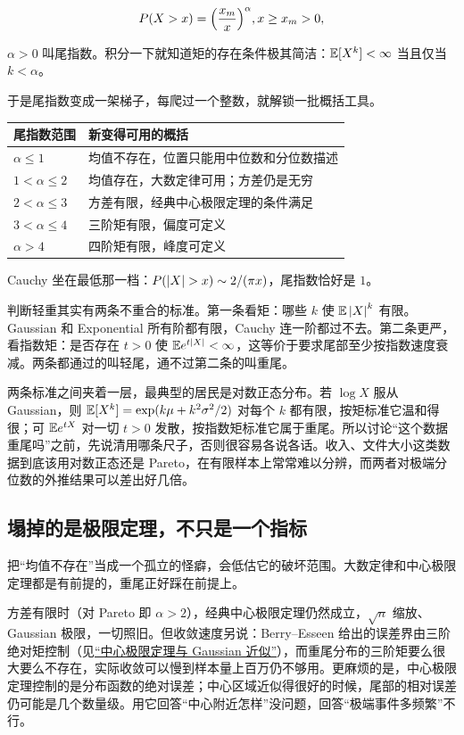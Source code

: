 \[
P(X>x)=\Bigl(\frac{x_m}{x}\Bigr)^{\alpha},\qquad x\ge x_m>0,
\]

\(\alpha>0\) 叫尾指数。积分一下就知道矩的存在条件极其简洁：\(\E[X^k]<\infty\) 当且仅当 \(k<\alpha\)。

于是尾指数变成一架梯子，每爬过一个整数，就解锁一批概括工具。

{\def\LTcaptype{none}
\begin{longtable}{@{}ll@{}}
\toprule\noalign{}
尾指数范围 & 新变得可用的概括 \\
\midrule\noalign{}
\endhead
\bottomrule\noalign{}
\endlastfoot
\(\alpha\le1\) & 均值不存在，位置只能用中位数和分位数描述 \\
\(1<\alpha\le2\) & 均值存在，大数定律可用；方差仍是无穷 \\
\(2<\alpha\le3\) & 方差有限，经典中心极限定理的条件满足 \\
\(3<\alpha\le4\) & 三阶矩有限，偏度可定义 \\
\(\alpha>4\) & 四阶矩有限，峰度可定义 \\
\end{longtable}
}

Cauchy 坐在最低那一档：\(P(\abs X>x)\sim 2/(\pi x)\)，尾指数恰好是 \(1\)。

判断轻重其实有两条不重合的标准。第一条看矩：哪些 \(k\) 使 \(\E\abs X^k\) 有限。Gaussian 和 Exponential 所有阶都有限，Cauchy 连一阶都过不去。第二条更严，看指数矩：是否存在 \(t>0\) 使 \(\E e^{t\abs X}<\infty\)，这等价于要求尾部至少按指数速度衰减。两条都通过的叫轻尾，通不过第二条的叫重尾。

两条标准之间夹着一层，最典型的居民是对数正态分布。若 \(\log X\) 服从 Gaussian，则 \(\E[X^k]=\exp(k\mu+k^2\sigma^2/2)\) 对每个 \(k\) 都有限，按矩标准它温和得很；可 \(\E e^{tX}\) 对一切 \(t>0\) 发散，按指数矩标准它属于重尾。所以讨论``这个数据重尾吗''之前，先说清用哪条尺子，否则很容易各说各话。收入、文件大小这类数据到底该用对数正态还是 Pareto，在有限样本上常常难以分辨，而两者对极端分位数的外推结果可以差出好几倍。

\subsection{塌掉的是极限定理，不只是一个指标}

把``均值不存在''当成一个孤立的怪癖，会低估它的破坏范围。大数定律和中心极限定理都是有前提的，重尾正好踩在前提上。

方差有限时（对 Pareto 即 \(\alpha>2\)），经典中心极限定理仍然成立，\(\sqrt n\) 缩放、Gaussian 极限，一切照旧。但收敛速度另说：Berry--Esseen 给出的误差界由三阶绝对矩控制（见\hyperref[sec:05-Probability/08-Limit-Theorems/03]{``中心极限定理与 Gaussian 近似''}），而重尾分布的三阶矩要么很大要么不存在，实际收敛可以慢到样本量上百万仍不够用。更麻烦的是，中心极限定理控制的是分布函数的绝对误差；中心区域近似得很好的时候，尾部的相对误差仍可能是几个数量级。用它回答``中心附近怎样''没问题，回答``极端事件多频繁''不行。

